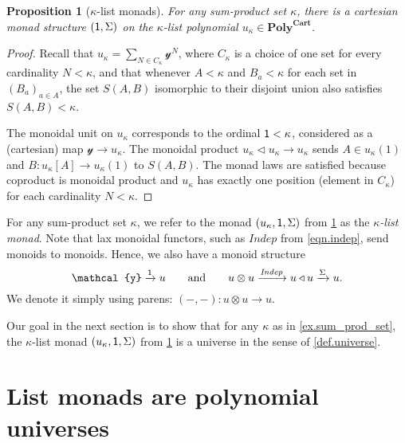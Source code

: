 \documentclass[11pt, one side, article]{memoir}
\theoremstyle{definition}
\theoremstyle{plain}
\newtheorem{proposition}[definitionx]{Proposition}
\newenvironment{definition}
  {\pushQED{\qed}\renewcommand{\qedsymbol}{$\lozenge$}\definitionx}
  {\popQED\enddefinitionx}
\newcommand{\Cat}[1]{\mathbf{#1}}%
\newcommand{\Fun}[1]{\mathit{#1}}%
\newcommand{\To}[2][]{\xrightarrow[#1]{#2}}
\newcommand{\yon}{\mathcal{y}}
\newcommand{\poly}{\Cat{Poly}}
\newcommand{\polycart}{\poly^{\Cat{Cart}}}
\newcommand{\0}{\textsf{0}}
\newcommand{\1}{\tn{\textsf{1}}}
\newcommand{\tri}{\mathbin{\triangleleft}}
\newcommand{\indep}{\Fun{Indep}}
\newcommand{\qqand}{\qquad\text{and}\qquad}
\begin{document}
\begin{proposition}[$\kappa$-list monads]\label{prop.list_monad}
For any sum-product set $\kappa$, there is a cartesian monad structure $(\1,\Sigma)$ on the $\kappa$-list polynomial $u_\kappa\in\polycart$.
\end{proposition}
\begin{proof}
Recall that $u_\kappa=\sum_{N\in C_\kappa}\yon^N$, where $C_\kappa$ is a choice of one set for every cardinality $N<\kappa$, and that whenever $A<\kappa$ and $B_a<\kappa$ for each set in $(B_a)_{a\in A}$, the set $S(A,B)$ isomorphic to their disjoint union also satisfies $S(A,B)<\kappa$. 

The monoidal unit on $u_\kappa$ corresponds to the ordinal $\1<\kappa$, considered as a (cartesian) map $\yon\to u_\kappa$. The monoidal product $u_\kappa\tri u_\kappa\to u_\kappa$ sends $A\in u_\kappa(1)$ and $B\colon u_\kappa[A]\to u_\kappa(1)$ to $S(A,B)$. The monad laws are satisfied because coproduct is monoidal product and $u_\kappa$ has exactly one position (element in $C_\kappa$) for each cardinality $N<\kappa$. 
\end{proof}

\begin{definition}[$\kappa$-list monads]
For any sum-product set $\kappa$, we refer to the monad $(u_\kappa,\1,\Sigma)$ from \cref{prop.list_monad} as the \emph{$\kappa$-list monad}. Note that lax monoidal functors, such as $\indep$ from \eqref{eqn.indep}, send monoids to monoids. Hence, we also have a monoid structure 
\begin{equation}\label{eqn.otimes_monoid}
	\yon\To{\1} u
	\qqand
	u\otimes u\To{\indep} u\tri u\To{\Sigma}u.
\end{equation}
We denote it simply using parens: $(-,-)\colon u\otimes u\to u$.
\end{definition}

Our goal in the next section is to show that for any $\kappa$ as in \cref{ex.sum_prod_set}, the $\kappa$-list monad $(u_\kappa,\1,\Sigma)$ from \cref{prop.list_monad} is a universe in the sense of \cref{def.universe}.

\chapter{List monads are polynomial universes}
\end{document}
